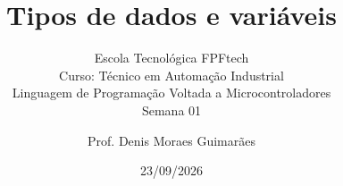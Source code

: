 \title{Tipos de dados e variáveis}
\subtitle{\texorpdfstring{Escola Tecnológica FPFtech\\[0.2cm]
Curso: Técnico em Automação Industrial\\[0.2cm]
\small Linguagem de Programação Voltada a Microcontroladores\\[0.15cm]
Semana 01}{FPFtech — Técnico em Automação Industrial — Semana 01}}
\author{Prof. Denis Moraes Guimarães}
\date{23/09/2026}
